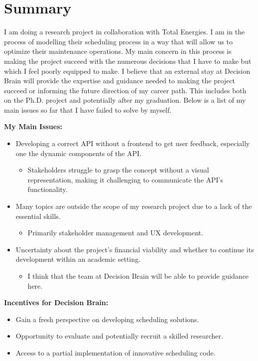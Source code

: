 \section*{Summary}
I am doing a research project in collaboration with Total Energies. I am in the process of modelling 
their scheduling process in a way that will allow us to optimize their maintenance operations. My main concern
in this process is making the project succeed with the numerous decisions that I have to make but 
which I feel poorly equipped to make. I believe that an external stay at Decision Brain will provide the 
expertise and guidance needed to making the project succeed or informing the future direction of my career path. 
This includes both on the Ph.D. project and potentially after my graduation. Below is a list of my main issues so far 
that I have failed to solve by myself. 

\textbf{My Main Issues:}
\begin{itemize}
	\item Developing a correct API without a frontend to get user feedback, especially one the dynamic components of the API.
	\begin{itemize}
		\item Stakeholders struggle to grasp the concept without a visual representation, making it challenging to communicate the API's functionality.
	\end{itemize}
	\item Many topics are outside the scope of my research project due to a lack of the essential skills. 
	\begin{itemize}
		\item Primarily stakeholder management and UX development.
	\end{itemize}
	\item Uncertainty about the project's financial viability and whether to continue its development within an academic setting.
	\begin{itemize}
		\item I think that the team at Decision Brain will be able to provide guidance here.
	\end{itemize}
\end{itemize}

\textbf{Incentives for Decision Brain:} 
\begin{itemize} 
	\item Gain a fresh perspective on developing scheduling solutions. 
	\item Opportunity to evaluate and potentially recruit a skilled researcher. 
	\item Access to a partial implementation of innovative scheduling code.
\end{itemize}
